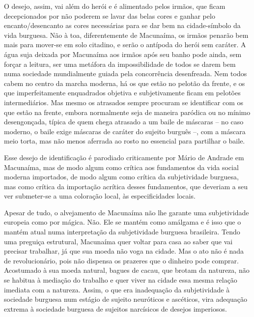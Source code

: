 O desejo, assim, vai além do herói e é alimentado pelos irmãos, que
ficam decepcionados por não poderem se lavar das belas cores e ganhar
pelo encanto/desencanto as cores necessárias para se dar bem na
cidade-símbolo da vida burguesa. Não à toa, diferentemente de Macunaíma,
os irmãos penarão bem mais para mover-se em solo citadino, e serão o
antípoda do herói sem caráter. A água suja deixada por Macunaíma aos
irmãos após seu banho pode ainda, sem forçar a leitura, ser uma metáfora
da impossibilidade de todos se darem bem numa sociedade mundialmente
guiada pela concorrência desenfreada. Nem todos cabem no centro da
marcha moderna, há os que estão no pelotão da frente, e os que
imperfeitamente enquadrados objetiva e subjetivamente ficam em pelotões
intermediários. Mas mesmo os atrasados sempre procuram se identificar
com os que estão na frente, embora normalmente seja de maneira paródica
ou no mínimo desengonçada, típica de quem chega atrasado a um baile de
máscaras -- no caso moderno, o baile exige máscaras de caráter do
sujeito burguês --, com a máscara meio torta, mas não menos aferrada ao
rosto no essencial para partilhar o baile.

Esse desejo de identificação é parodiado criticamente por Mário de
Andrade em Macunaíma, mas de modo algum como crítica aos fundamentos da
vida social moderna importados, de modo algum como crítica da
subjetividade burguesa, mas como crítica da importação acrítica desses
fundamentos, que deveriam a seu ver submeter-se a uma coloração local,
às especificidades locais.

Apesar de tudo, o alvejamento de Macunaíma não lhe garante uma
subjetividade europeia como por mágica. Não. Ele se mantém como amálgama
e é isso que o mantém atual numa interpretação da subjetividade burguesa
brasileira. Tendo uma preguiça estrutural, Macunaíma quer voltar para
casa ao saber que vai precisar trabalhar, já que sua moeda não voga na
cidade. Mas o ato não é nada de revolucionário, pois não dispensa os
prazeres que o dinheiro pode comprar. Acostumado à sua moeda natural,
bagues de cacau, que brotam da natureza, não se habitua à mediação do
trabalho e quer viver na cidade essa mesma relação imediata com a
natureza. Assim, o que era inadequação da subjetividade à sociedade
burguesa num estágio de sujeito neuróticos e ascéticos, vira adequação
extrema à sociedade burguesa de sujeitos narcísicos de desejos
imperiosos.

